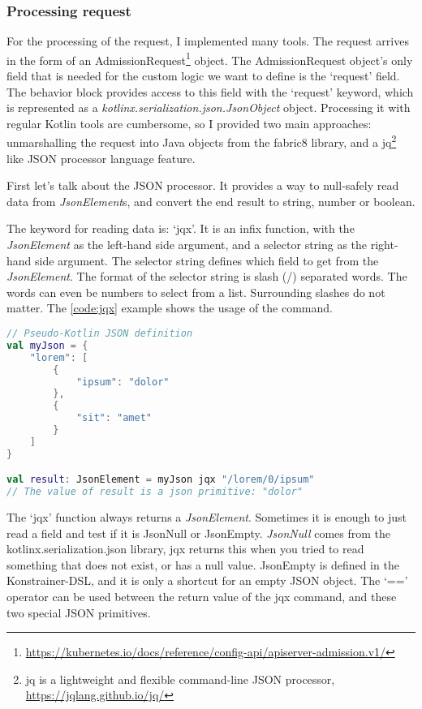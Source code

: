 \subsubsection{Processing request}

For the processing of the request, I implemented many tools. The request arrives in the form of an AdmissionRequest\footnote{\url{https://kubernetes.io/docs/reference/config-api/apiserver-admission.v1/}} object. The AdmissionRequest object's only field that is needed for the custom logic we want to define is the `request' field. The behavior block provides access to this field with the `request' keyword, which is represented as a \emph{kotlinx.serialization.json.JsonObject }object. Processing it with regular Kotlin tools are cumbersome, so I provided two main approaches: unmarshalling the request into Java objects from the fabric8 library, and a jq\footnote{jq is a lightweight and flexible command-line JSON processor, \url{https://jqlang.github.io/jq/}} like JSON processor language feature. 

First let's talk about the JSON processor. It provides a way to null-safely read data from \emph{JsonElement}s, and convert the end result to string, number or boolean. 

The keyword for reading data is: `jqx'. It is an infix function, with the \emph{JsonElement} as the left-hand side argument, and a selector string as the right-hand side argument. The selector string defines which field to get from the \emph{JsonElement}. The format of the selector string is slash (/) separated words. The words can even be numbers to select from a list. Surrounding slashes do not matter. The \ref{code:jqx} example shows the usage of the command.

\begin{lstlisting}[caption={Usage of `jqx'},language=Kotlin,label=code:jqx]
// Pseudo-Kotlin JSON definition
val myJson = {
    "lorem": [
        {
            "ipsum": "dolor"
        },
        {
            "sit": "amet"
        }
    ]
}

val result: JsonElement = myJson jqx "/lorem/0/ipsum"
// The value of result is a json primitive: "dolor"
\end{lstlisting}

The `jqx' function always returns a \emph{JsonElement}. Sometimes it is enough to just read a field and test if it is JsonNull or JsonEmpty. \emph{JsonNull} comes from the kotlinx.serialization.json library, jqx returns this when you tried to read something that does not exist, or has a null value. JsonEmpty is defined in the Konstrainer-DSL, and it is only a shortcut for an empty JSON object. The `==' operator can be used between the return value of the jqx command, and these two special JSON primitives.

